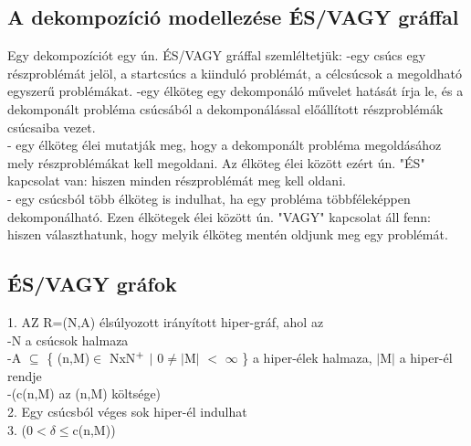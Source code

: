 \documentclass{article}
\begin{document}
	 \subsection{A dekompozíció modellezése ÉS/VAGY gráffal}
	 Egy dekompozíciót egy ún. ÉS/VAGY gráffal szemléltetjük:
	 -egy csúcs egy részproblémát jelöl, a startcsúcs a kiinduló problémát, a célcsúcsok a megoldható egyszerű problémákat.
	 -egy élköteg egy dekomponáló művelet hatását írja le, és a dekomponált probléma csúcsából a dekomponálással előállított részproblémák csúcsaiba vezet.\\
	 \hspace*{1em}- egy élköteg élei mutatják meg, hogy a dekomponált probléma megoldásához\\
	 \hspace*{1em}  mely részproblémákat kell megoldani. Az élköteg élei között ezért ún. "ÉS"\\
	 \hspace*{1em}  kapcsolat van: hiszen minden részproblémát meg kell oldani.\\
	 \hspace*{1em}- egy csúcsból több élköteg is indulhat, ha egy probléma többféleképpen\\
	 \hspace*{1em} dekomponálható. Ezen élkötegek élei között ún. "VAGY" kapcsolat áll fenn:\\
	 \hspace*{1em} hiszen választhatunk, hogy melyik élköteg mentén oldjunk meg egy problémát.
	 
	 \subsection{ÉS/VAGY gráfok}
	 1. AZ R=(N,A) élsúlyozott irányított hiper-gráf, ahol az\\
	 \hspace*{1em}-N a csúcsok halmaza\\
	 \hspace*{1em}-A $\subseteq$ \{ (n,M)$\in$ NxN$\textsuperscript{+}$ $|$ 0$\neq$$|$M$|$ $<$ $\infty$ \} a hiper-élek halmaza, $|$M$|$ a hiper-él\\
	 \hspace*{1em} rendje\\
	 \hspace*{1em}-(c(n,M) az (n,M) költsége)\\
	 2. Egy csúcsból véges sok hiper-él indulhat\\
	 3. (0$<$$\delta$$\leq$c(n,M))
	 
\end{document}
